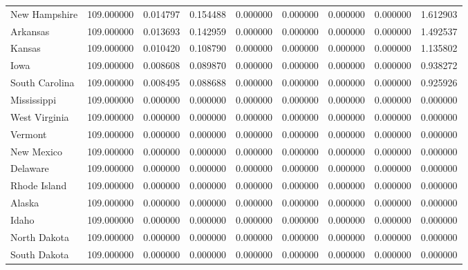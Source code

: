 \begin{tabular}{lrrrrrrrr}
New Hampshire & 109.000000 & 0.014797 & 0.154488 & 0.000000 & 0.000000 & 0.000000 & 0.000000 & 1.612903 \\
Arkansas & 109.000000 & 0.013693 & 0.142959 & 0.000000 & 0.000000 & 0.000000 & 0.000000 & 1.492537 \\
Kansas & 109.000000 & 0.010420 & 0.108790 & 0.000000 & 0.000000 & 0.000000 & 0.000000 & 1.135802 \\
Iowa & 109.000000 & 0.008608 & 0.089870 & 0.000000 & 0.000000 & 0.000000 & 0.000000 & 0.938272 \\
South Carolina & 109.000000 & 0.008495 & 0.088688 & 0.000000 & 0.000000 & 0.000000 & 0.000000 & 0.925926 \\
Mississippi & 109.000000 & 0.000000 & 0.000000 & 0.000000 & 0.000000 & 0.000000 & 0.000000 & 0.000000 \\
West Virginia & 109.000000 & 0.000000 & 0.000000 & 0.000000 & 0.000000 & 0.000000 & 0.000000 & 0.000000 \\
Vermont & 109.000000 & 0.000000 & 0.000000 & 0.000000 & 0.000000 & 0.000000 & 0.000000 & 0.000000 \\
New Mexico & 109.000000 & 0.000000 & 0.000000 & 0.000000 & 0.000000 & 0.000000 & 0.000000 & 0.000000 \\
Delaware & 109.000000 & 0.000000 & 0.000000 & 0.000000 & 0.000000 & 0.000000 & 0.000000 & 0.000000 \\
Rhode Island & 109.000000 & 0.000000 & 0.000000 & 0.000000 & 0.000000 & 0.000000 & 0.000000 & 0.000000 \\
Alaska & 109.000000 & 0.000000 & 0.000000 & 0.000000 & 0.000000 & 0.000000 & 0.000000 & 0.000000 \\
Idaho & 109.000000 & 0.000000 & 0.000000 & 0.000000 & 0.000000 & 0.000000 & 0.000000 & 0.000000 \\
North Dakota & 109.000000 & 0.000000 & 0.000000 & 0.000000 & 0.000000 & 0.000000 & 0.000000 & 0.000000 \\
South Dakota & 109.000000 & 0.000000 & 0.000000 & 0.000000 & 0.000000 & 0.000000 & 0.000000 & 0.000000 \\
\bottomrule
\end{tabular}
